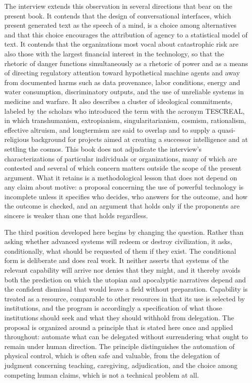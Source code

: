 The interview extends this observation in several directions that bear on the present book. It contends that the design of conversational interfaces, which present generated text as the speech of a mind, is a choice among alternatives and that this choice encourages the attribution of agency to a statistical model of text. It contends that the organizations most vocal about catastrophic risk are also those with the largest financial interest in the technology, so that the rhetoric of danger functions simultaneously as a rhetoric of power and as a means of directing regulatory attention toward hypothetical machine agents and away from documented harms such as data provenance, labor conditions, energy and water consumption, discriminatory outputs, and the use of unreliable systems in medicine and warfare. It also describes a cluster of ideological commitments, labeled by the scholars who introduced the term with the acronym TESCREAL, in which transhumanism, extropianism, singularitarianism, cosmism, rationalism, effective altruism, and longtermism are said to overlap and to supply a quasi-religious background for projects aimed at creating a successor intelligence and at settling the cosmos. This book does not adjudicate the interview's characterizations of particular individuals or organizations, many of which are contested and several of which concern matters outside the scope of the present argument. What it retains is a methodological lesson that does not depend on any claim about motive: a proposal concerning the use of powerful technology is incomplete unless it specifies who decides, who answers for the outcome, and how the outcome is checked, and an argument that holds only if the proponents are sincere is weaker than one that holds regardless.

The third position developed here begins by changing the question. Rather than asking whether advanced systems will redeem or destroy civilization, it asks, conditionally, what should be requested of them if they exist. The conditional form is deliberate and does real work. It neither asserts that systems of the relevant capability will arrive nor denies that they might, and it thereby avoids both the prediction on which the utopian and apocalyptic narratives depend and the confident dismissal that would leave a field without preparation. Capability is treated as a resource, comparable to other resources in that its use is selected by institutions, and the program is accordingly a specification of what those institutions should seek and what they should withhold from delegation. The proposal is organized around a principle that is stated here once and applied throughout: automate what can be delegated without surrendering what ought to remain under human direction. The principle distinguishes the automation of physical control, which is often safe and valuable, from the delegation of judgment concerning teaching, caregiving, adjudication, and the choice among competing human claims, which is not a technical problem at all.

